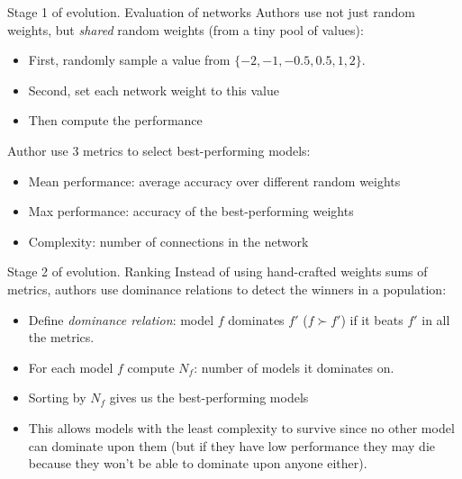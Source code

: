 \documentclass[handout, 10pt]{beamer}
\begin{document}
\begin{frame}{Stage 1 of evolution. Evaluation of networks}
\pause Authors use not just random weights, but \textit{shared} random weights (from a tiny pool of values):
\begin{itemize}
    \item\pause First, randomly sample a value from $\{-2, -1, -0.5, 0.5, 1, 2\}$.
    \item\pause Second, set each network weight to this value
    \item\pause Then compute the performance
\end{itemize}

\pause Author use 3 metrics to select best-performing models:
    \begin{itemize}
        \item\pause Mean performance: average accuracy over different random weights
        \item\pause Max performance: accuracy of the best-performing weights
        \item\pause Complexity: number of connections in the network
    \end{itemize}
\end{frame}


\begin{frame}{Stage 2 of evolution. Ranking}
\pause Instead of using hand-crafted weights sums of metrics, authors use dominance relations to detect the winners in a population:
\begin{itemize}
    \item\pause Define \textit{dominance relation}: model $f$ dominates $f'$ ($f \succ f'$) if it beats $f'$ in all the metrics.
    \item\pause For each model $f$ compute $N_f$: number of models it dominates on.
    \item\pause Sorting by $N_f$ gives us the best-performing models
    \item\pause This allows models with the least complexity to survive since no other model can dominate upon them (but if they have low performance they may die because they won't be able to dominate upon anyone either).
\end{itemize}

\end{frame}
\end{document}
